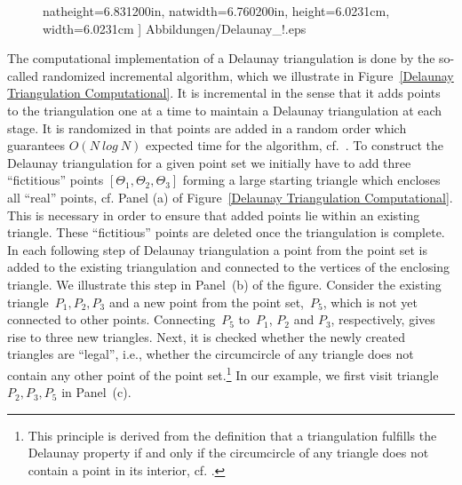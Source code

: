 \documentclass[a4paper,12pt]{article}%
\begin{document}
\begin{figure}[htb]
\begin{tabular}
{natheight=6.831200in,
natwidth=6.760200in,
height=6.0231cm,
width=6.0231cm
]%
{Abbildungen/Delaunay_!.eps}%
}
\\
%
\end{tabular}
\label{Delaunay Triangulation}%
\end{figure}%


The computational implementation of a Delaunay triangulation is done by the
so-called randomized incremental algorithm, which we illustrate in
Figure~\ref{Delaunay Triangulation Computational}. It is incremental in the
sense that it adds points to the triangulation one at a time to maintain a
Delaunay triangulation at each stage. It is randomized in that points are
added in a random order which guarantees $O(N~log~N)$ expected time for the
algorithm, cf.~. To construct the Delaunay
triangulation for a given point set we initially have to add three
``fictitious'' points $\left[  \Theta_{1},\Theta_{2},\Theta_{3}\right]  $
forming a large starting triangle which encloses all ``real'' points, cf.
Panel (a) of Figure~\ref{Delaunay Triangulation Computational}. This is
necessary in order to ensure that added points lie within an existing
triangle. These ``fictitious'' points are deleted once the triangulation is
complete. In each following step of Delaunay triangulation a point from the
point set is added to the existing triangulation and connected to the vertices
of the enclosing triangle. We illustrate this step in Panel~(b) of the figure.
Consider the existing triangle~$P_{1},P_{2},P_{3}$ and a new point from the
point set,~$P_{5}$, which is not yet connected to other points.
Connecting~$P_{5}$ to~$P_{1}$, $P_{2}$ and $P_{3}$, respectively, gives rise
to three new triangles. Next, it is checked whether the newly created
triangles are ``legal'', i.e., whether the circumcircle of any triangle does
not contain any other point of the point set.\footnote{This principle is
derived from the definition that a triangulation fulfills the Delaunay
property if and only if the circumcircle of any triangle does not contain a
point in its interior, cf.
%
.} In our example, we first visit triangle~$P_{2},P_{3},P_{5}$ in Panel~(c).
\end{document}
